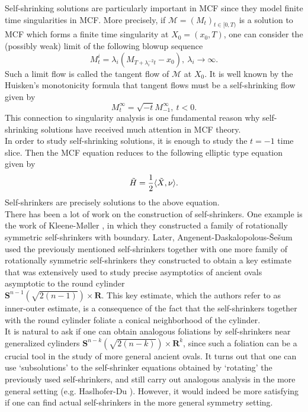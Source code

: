 \documentclass[pdflatex,sn-mathphys-num]{sn-jnl}
\begin{document}
Self-shrinking solutions are particularly important in MCF since they model finite time singularities in MCF. More precisely, if $\mathcal{M} = (M_t)_{t \in [0, T)}$ is a solution to MCF which forms a finite time singularity at $X_0 = (x_0, T)$, one can consider the (possibly weak) limit of the following blowup sequence
\begin{equation}
    M^i_t = \lambda_i(M_{T + \lambda^{-2}_it} - x_0), \ \lambda_i \to \infty.
\end{equation}
Such a limit flow is called the tangent flow of $\mathcal{M}$ at $X_0$. It is well known by the Huisken's monotonicity formula \cite{Hu} that tangent flows must be a self-shrinking flow given by
\begin{equation}
    M^{\infty}_t = \sqrt{-t}M^{\infty}_{-1}, \ t < 0.
\end{equation}
This connection to singularity analysis is one fundamental reason why self-shrinking solutions have received much attention in MCF theory. \\

In order to study self-shrinking solutions, it is enough to study the $t = -1$ time slice. Then the MCF equation reduces to the following elliptic type equation given by
\begin{equation}\label{self shrinker equation}
    \Tilde{H} = \frac{1}{2}\langle \Tilde{X}, \nu \rangle.
\end{equation}
Self-shrinkers are precisely solutions to the above equation.\\

There has been a lot of work on the construction of self-shrinkers. One example is the work of Kleene-M\o ller \cite{KM}, in which they constructed a family of rotationally symmetric self-shrinkers with boundary. Later, Angenent-Daskalopolous-\v{S}e\v{s}um \cite{ADS} used the previously mentioned self-shrinkers together with one more family of rotationally symmetric self-shrinkers they constructed to obtain a key estimate that was extensively used to study precise asymptotics of ancient ovals asymptotic to the round cylinder \\
$\mathbf{S}^{n-1}(\sqrt{2(n-1)}) \times \mathbf{R}$. This key estimate, which the authors refer to as inner-outer estimate, is a consequence of the fact that the self-shrinkers together with the round cylinder foliate a conical neighborhood of the cylinder. \\

It is natural to ask if one can obtain analogous foliations by self-shrinkers near generalized cylinders $\mathbf{S}^{n-k}(\sqrt{2(n-k)}) \times \mathbf{R}^k$, since such a foliation can be a crucial tool in the study of more general ancient ovals. It turns out that one can use `subsolutions' to the self-shrinker equations obtained by `rotating' the previously used self-shrinkers, and still carry out analogous analysis in the more general setting (e.g. Haslhofer-Du \cite{Du}). However, it would indeed be more satisfying if one can find actual self-shrinkers in the more general symmetry setting. \\
\end{document}
